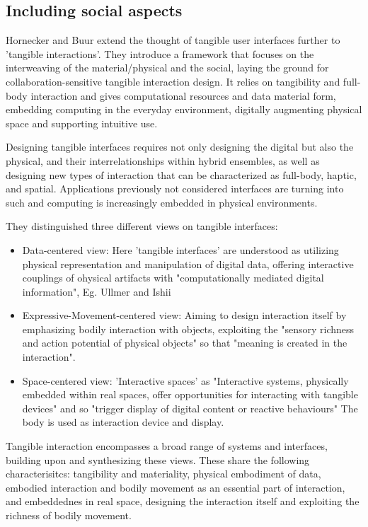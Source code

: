 \subsection{Including social aspects}
Hornecker and Buur \cite{hornecker06} extend the thought of tangible user interfaces further to 'tangible interactions'. They introduce a framework that focuses on the interweaving of the material/physical and the social, laying the ground for collaboration-sensitive tangible interaction design. It relies on tangibility and full-body interaction and gives computational resources and data material form, embedding computing in the everyday environment, digitally augmenting physical space and supporting intuitive use. 

Designing tangible interfaces requires not only designing the digital but also the physical, and their interrelationships within hybrid ensembles, as well as designing new types of interaction that can be characterized as full-body, haptic, and spatial.
Applications previously not considered interfaces are turning into such and computing is increasingly embedded in physical environments.

They distinguished three different views on tangible interfaces:
\begin{itemize}
\item Data-centered view: Here 'tangible interfaces' are understood as utilizing physical representation and manipulation of digital data, offering interactive couplings of ohysical artifacts with "computationally mediated digital information", Eg. Ullmer and Ishii
\item Expressive-Movement-centered view: Aiming to design interaction itself by emphasizing bodily interaction with objects, exploiting the "sensory richness and action potential of physical objects" so that "meaning is created in the interaction".
\item Space-centered view: 'Interactive spaces' as "Interactive systems, physically embedded within real spaces, offer opportunities for interacting with tangible devices" and so "trigger display of digital content or reactive behaviours" The body is used as interaction device and display.
\end{itemize}

Tangible interaction encompasses a broad range of systems and interfaces, building upon and synthesizing these views. These share the following characterisitcs: tangibility and materiality, physical embodiment of data, embodied interaction and bodily movement as an essential part of interaction, and embeddednes in real space, designing the interaction itself and exploiting the richness of bodily movement.


